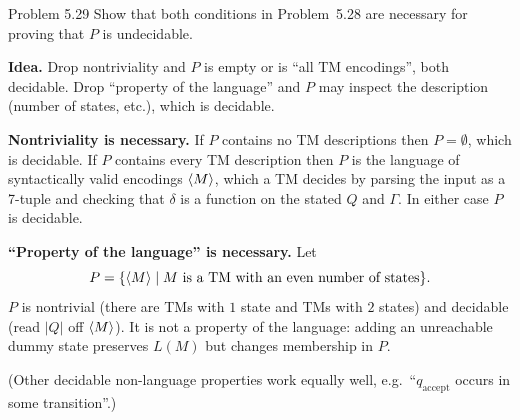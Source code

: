 \begin{question}{Problem 5.29}
Show that both conditions in Problem~5.28 are necessary for proving that $P$ is undecidable.
\end{question}
\begin{soln}
\textbf{Idea.} Drop nontriviality and $P$ is empty or is ``all TM encodings'', both decidable. Drop ``property of the language'' and $P$ may inspect the description (number of states, etc.), which is decidable.

\textbf{Nontriviality is necessary.} If $P$ contains no TM descriptions then $P=\emptyset$, which is decidable. If $P$ contains every TM description then $P$ is the language of syntactically valid encodings $\langle M\rangle$, which a TM decides by parsing the input as a 7-tuple and checking that $\delta$ is a function on the stated $Q$ and $\Gamma$. In either case $P$ is decidable.

\textbf{``Property of the language'' is necessary.} Let
\[
P=\{\langle M\rangle\mid M\text{ is a TM with an even number of states}\}.
\]
$P$ is nontrivial (there are TMs with $1$ state and TMs with $2$ states) and decidable (read $|Q|$ off $\langle M\rangle$). It is not a property of the language: adding an unreachable dummy state preserves $L(M)$ but changes membership in $P$.

(Other decidable non-language properties work equally well, e.g.\ ``$q_{\mathrm{accept}}$ occurs in some transition''.)
\end{soln}

